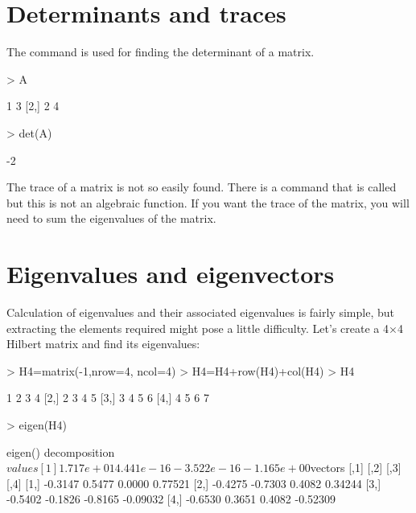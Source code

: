  
\section{Determinants and traces} 
 
The  command is used for finding the determinant of a matrix. 

\begin{Schunk}
\begin{Sinput}
> A 
\end{Sinput}
\begin{Soutput}
     [,1] [,2]
[1,]    1    3
[2,]    2    4
\end{Soutput}
\begin{Sinput}
> det(A) 
\end{Sinput}
\begin{Soutput}
[1] -2
\end{Soutput}
\end{Schunk}

 
The trace of a matrix is not so easily found. There is a command that is called  but this is not an algebraic function. If you want the trace of the matrix, you will need to sum the eigenvalues of the matrix. 
 
\section{Eigenvalues and eigenvectors} 
 
Calculation of eigenvalues and their associated eigenvalues is fairly simple, but extracting the elements required might pose a little difficulty. 
 Let's create a 4$\times$4 Hilbert matrix and find its eigenvalues: 

\begin{Schunk}
\begin{Sinput}
> H4=matrix(-1,nrow=4, ncol=4) 
> H4=H4+row(H4)+col(H4) 
> H4 
\end{Sinput}
\begin{Soutput}
     [,1] [,2] [,3] [,4]
[1,]    1    2    3    4
[2,]    2    3    4    5
[3,]    3    4    5    6
[4,]    4    5    6    7
\end{Soutput}
\begin{Sinput}
> eigen(H4) 
\end{Sinput}
\begin{Soutput}
eigen() decomposition
$values
[1]  1.717e+01  4.441e-16 -3.522e-16 -1.165e+00

$vectors
        [,1]    [,2]    [,3]     [,4]
[1,] -0.3147  0.5477  0.0000  0.77521
[2,] -0.4275 -0.7303  0.4082  0.34244
[3,] -0.5402 -0.1826 -0.8165 -0.09032
[4,] -0.6530  0.3651  0.4082 -0.52309
\end{Soutput}
\end{Schunk}

